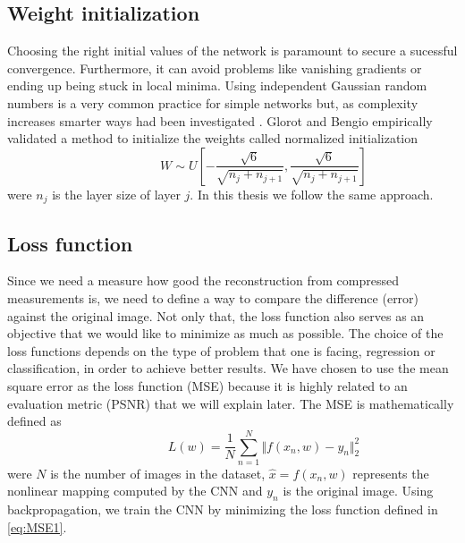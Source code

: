 \subsection{Weight initialization}
Choosing the right initial values of the network is paramount to secure a sucessful convergence. Furthermore, it can avoid problems like vanishing gradients or ending up being stuck in local minima. Using independent Gaussian random numbers is a very common practice for simple networks but, as complexity increases smarter ways had been investigated \cite{glorot2010understanding}. Glorot and Bengio empirically validated a method to initialize the weights called normalized initialization 
\begin{equation} \label{eq:Initw1}
\hspace{3em} \hspace{3em} \hspace{3em} W \sim U [ - \frac{\sqrt{6}}{\sqrt{n_j + n_{j+1}}}, \frac{\sqrt{6}}{\sqrt{n_j + n_{j+1}}} ] \enspace \enspace \hspace{3em}
\end{equation}  
were $n_j$ is the layer size of layer $j$. In this thesis we follow the same approach.   

\subsection{Loss function}
Since we need a measure how good the reconstruction from compressed measurements is, we need to define a way to compare the difference (error) against the original image. Not only that, the loss function also serves as an objective that we would like to minimize as much as possible. The choice of the loss functions depends on the type of problem that one is facing, regression or classification, in order to achieve better results. We have chosen to use the mean square error as the loss function (MSE) because it is highly related to an evaluation metric (PSNR) that we will explain later. The MSE is mathematically defined as 
\begin{equation} \label{eq:MSE1}
\hspace{3em} \hspace{3em} \hspace{3em} L (w) = \frac{1}{N} \sum\limits_{n=1}^N \Vert f(x_n,w) - y_n\Vert_{2}^2 \enspace \enspace \hspace{3em}
\end{equation} 
were $N$ is the number of images in the dataset, $\hat{x} = f(x_n,w)$ represents the nonlinear mapping computed by the CNN and $y_n$ is the original image. Using backpropagation, we train the CNN by minimizing the loss function defined in \ref{eq:MSE1}.  

